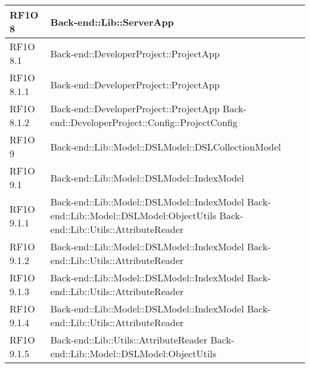\begin{center}
\begin{longtable}{ | p{3cm} | p{11cm} | }
    RF1O 8 & Back-end::Lib::ServerApp \newline  \\ \hline   
       
    RF1O 8.1  & Back-end::DeveloperProject::ProjectApp \newline  \\ \hline  
        
    RF1O 8.1.1 & Back-end::DeveloperProject::ProjectApp \newline  \\ \hline      
    RF1O 8.1.2 & Back-end::DeveloperProject::ProjectApp \newline Back-end::DeveloperProject::Config::ProjectConfig \newline  \\ \hline        
           
    RF1O 9 & Back-end::Lib::Model::DSLModel::DSLCollectionModel\newline  \\ \hline      
    
    RF1O 9.1 & Back-end::Lib::Model::DSLModel::IndexModel \newline  \\ \hline   
       
    RF1O 9.1.1 & Back-end::Lib::Model::DSLModel::IndexModel \newline Back-end::Lib::Model::DSLModel:ObjectUtils \newline
    				Back-end::Lib::Utils::AttributeReader \\ \hline      
    
    RF1O 9.1.2 & Back-end::Lib::Model::DSLModel::IndexModel \newline Back-end::Lib::Utils::AttributeReader  \\ \hline      
    
    RF1O 9.1.3 &  Back-end::Lib::Model::DSLModel::IndexModel \newline Back-end::Lib::Utils::AttributeReader \\ \hline   
       
    RF1O 9.1.4 & Back-end::Lib::Model::DSLModel::IndexModel \newline Back-end::Lib::Utils::AttributeReader  \\ \hline 
         
    RF1O 9.1.5 & Back-end::Lib::Utils::AttributeReader \newline Back-end::Lib::Model::DSLModel:ObjectUtils \\ \hline      
    

\end{longtable}
\end{center}
